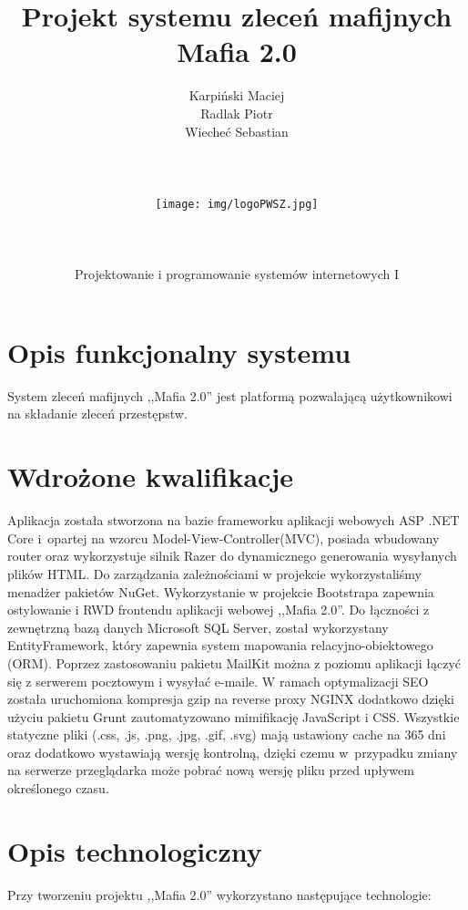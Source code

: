 \documentclass[12pt,a4paper]{article}
\author{Karpiński Maciej\\Radlak Piotr\\Wiecheć Sebastian\\\\\\\\\texttt{[image: img/logoPWSZ.jpg]}\\\\\\\\Projektowanie i programowanie systemów internetowych I}
\title{Projekt systemu zleceń mafijnych\\Mafia 2.0}
\begin{document}
	\maketitle
	\thispagestyle{empty}
	\clearpage

	\tableofcontents
	\newpage

	\section{Opis funkcjonalny systemu}
		\indent System zleceń mafijnych ,,Mafia 2.0'' jest platformą pozwalającą użytkownikowi na składanie zleceń przestępstw.
	\newpage

	\section{Wdrożone kwalifikacje}	
		\indent Aplikacja została stworzona na bazie frameworku aplikacji webowych ASP .NET Core i~opartej na wzorcu Model-View-Controller(MVC), posiada wbudowany router oraz wykorzystuje
		silnik Razer do dynamicznego generowania wysyłanych plików HTML. Do zarządzania zależnościami w projekcie wykorzystaliśmy menadżer pakietów NuGet. Wykorzystanie w projekcie
		Bootstrapa zapewnia ostylowanie	i RWD frontendu aplikacji webowej ,,Mafia 2.0''. Do łączności z zewnętrzną bazą danych Microsoft SQL Server, został wykorzystany EntityFramework,
		który zapewnia system mapowania relacyjno-obiektowego (ORM). Poprzez zastosowaniu pakietu MailKit można z poziomu aplikacji łączyć się z serwerem pocztowym i wysyłać e-maile.
		W ramach optymalizacji SEO została uruchomiona kompresja gzip na reverse proxy NGINX dodatkowo dzięki użyciu pakietu Grunt zautomatyzowano mimifikację JavaScript i CSS.
		Wszystkie statyczne pliki (.css, .js, .png, .jpg, .gif, .svg) mają ustawiony cache na 365 dni oraz dodatkowo wystawiają wersję kontrolną, dzięki czemu w~przypadku zmiany na serwerze
		przeglądarka może pobrać nową wersję pliku przed upływem określonego czasu.
	\newpage

	\section{Opis technologiczny}
		\indent Przy tworzeniu projektu ,,Mafia 2.0'' wykorzystano następujące technologie:
\end{document}
